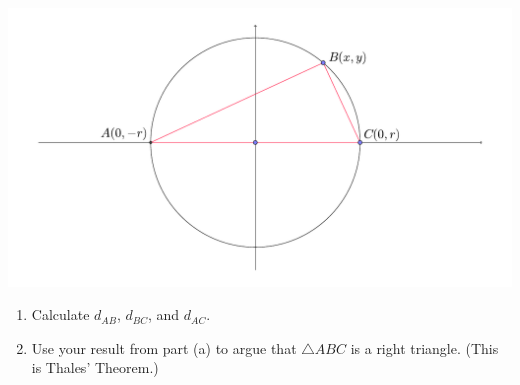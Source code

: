 \documentclass[12pt]{article}
\newif\ifans
\begin{document}
\begin{enumerate}
\begin{center}
\includegraphics[scale=0.5]{circle.pdf}
\end{center}

\begin{enumerate}

\item Calculate $d_{AB}$, $d_{BC}$, and $d_{AC}$.  

\ifans{\fbox{\parbox{1\linewidth}{Using the distance formula, we calculate the required lengths:
\begin{itemize}
\item $d_{AB}=\sqrt{(x-0)^2+(y+r)^2}=\sqrt{x^2+(y+r)^2}$
\item $d_{BC}=\sqrt{(0-x)^2+(r-y)^2}=\sqrt{x^2+(r-y)^2}$
\item $d_{AC}=2r$
\end{itemize}}}} \fi

\item Use your result from part (a) to argue that $\triangle ABC$ is a right triangle.  (This is Thales' Theorem.)

\ifans{\fbox{\parbox{1\linewidth}{We will show that $(d_{BC})^2+(d_{AB})^2=(d_{AC})^2$.  At some point in our calculation, we will use the fact that the circle has equation $x^2+y^2=r^2$.
\begin{align*}
(d_{BC})^2+(d_{AB})^2 &=\left(\sqrt{x^2+(r-y)^2}\right)^2+\left(\sqrt{x^2+(y+r)^2}\right)^2\\
&=x^2+(r-y)^2+x^2+(y+r)^2\\
&=x^2+r^2-2ry+y^2++x^2 +y^2+2ry+r^2\\
&=2(x^2+y^2)+2r^2\\
&=2r^2+2r^2 \\
&=4r^2\\
&=(d_{AC})^2
\end{align*}
Thus, since the Pythagorean Theorem is satisfied, $\triangle ABC$ is a right triangle.
}}} \fi


\end{enumerate}
\end{enumerate}
\end{document}
